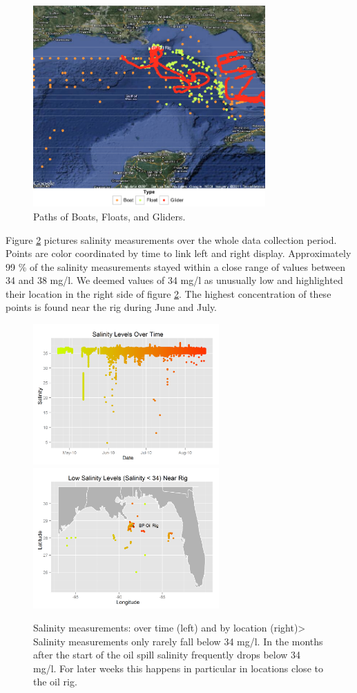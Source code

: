\documentclass[authoryear,12pt]{elsarticle}
\begin{document}
\begin{figure}[htbp] %
   \centering
   \includegraphics[width=3.5in]{boats-floats-gliders.png} 
   \caption{Paths of Boats, Floats, and Gliders. }
   \label{Boats, Floats and Gliders}
\end{figure}
Figure \ref {salinity-timeline} pictures  salinity measurements over the whole data collection period. Points are color coordinated by time to link left and right display. Approximately 99 \% of the salinity measurements stayed within a close range of values between 34 and 38 mg/l.
We deemed values of 34 mg/l as unusually low and highlighted their location in the right side of figure \ref{salinity-timeline}. The highest concentration of these points is found near the rig during June and July.
\begin{figure}[htbp] %
   \centering
   \includegraphics[width=2.8in]{salinity-time.png} 
   \includegraphics[width=2.8in]{salinity-map.png} 
   \caption{Salinity measurements: over time (left) and by location (right)> Salinity measurements only rarely fall below 34 mg/l. In the months after the start of the oil spill salinity frequently drops below 34 mg/l. For later weeks this happens in particular in locations close to the oil rig.}
   \label{salinity-timeline}
\end{figure}
\end{document}
